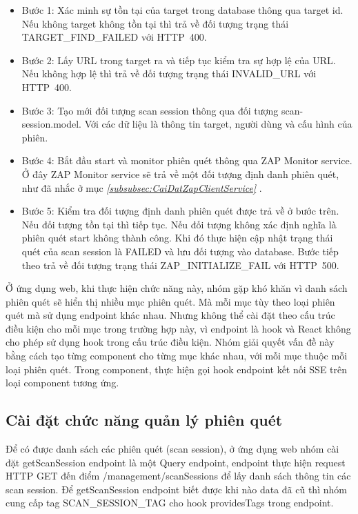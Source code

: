\begin{itemize}
  \item Bước 1: Xác minh sự tồn tại của target trong database thông qua target id. Nếu không target không tồn tại thì trả về đối tượng trạng thái TARGET\_FIND\_FAILED với HTTP\ 400.
  \item Bước 2: Lấy URL trong target ra và tiếp tục kiểm tra sự hợp lệ của URL. Nếu không hợp lệ thì trả về đối tượng trạng thái INVALID\_URL với HTTP\ 400.
  \item Bước 3: Tạo mới đối tượng scan session thông qua đối tượng scan-session.model. Với các dữ liệu là thông tin target, người dùng và cấu hình của phiên.
  \item Bước 4: Bắt đầu start và monitor phiên quét thông qua ZAP Monitor service. Ở đây ZAP Monitor service sẽ trả về một đối tượng định danh phiên quét, như đã nhắc ở mục \textit{\ref{subsubsec:CaiDatZapClientService} }.
  \item Bước 5: Kiểm tra đối tượng định danh phiên quét được trả về ở bước trên. Nếu đối tượng tồn tại thì tiếp tục. Nếu đối tượng không xác định nghĩa là phiên quét start không thành công. Khi đó thực hiện cập nhật trạng thái quét của scan session là FAILED và lưu đối tượng vào database. Bước tiếp theo trả về đối tượng trạng thái ZAP\_INITIALIZE\_FAIL với HTTP\ 500.
\end{itemize}

Ở ứng dụng web, khi thực hiện chức năng này, nhóm gặp khó khăn vì danh sách phiên quét sẽ hiển thị nhiều mục phiên quét.
Mà mỗi mục tùy theo loại phiên quét mà sử dụng endpoint khác nhau.
Nhưng không thể cài đặt theo cấu trúc điều kiện cho mỗi mục trong trường hợp này, vì endpoint là hook và React không cho phép sử dụng hook trong cấu trúc điều kiện.
Nhóm giải quyết vấn đề này bằng cách tạo từng component cho từng mục khác nhau, với mỗi mục thuộc mỗi loại phiên quét.
Trong component, thực hiện gọi hook endpoint kết nối SSE trên loại component tương ứng.

\subsection{Cài đặt chức năng quản lý phiên quét} \label{subsec:CaiDatQuanLyPhienQuet}

\tab Để có được danh sách các phiên quét (scan session), ở ứng dụng web nhóm cài đặt getScanSession endpoint là một Query endpoint, endpoint thực hiện request HTTP GET đến điểm /management/scanSessions để lấy danh sách thông tin các scan session. Để getScanSession endpoint biết được khi nào data đã cũ thì nhóm cung cấp tag SCAN\_SESSION\_TAG cho hook providesTags trong endpoint.

